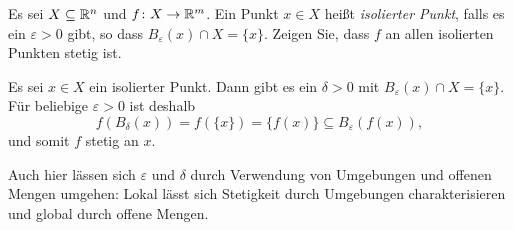 \documentclass[a4paper,10pt]{article}
\begin{document}
\begin{question}
 Es sei $X \subseteq \mathbb{R}^n$ und $f \colon X \to \mathbb{R}^m$. Ein Punkt $x \in X$ heißt \emph{isolierter Punkt}, falls es ein $\varepsilon > 0$ gibt, so dass $B_\varepsilon(x) \cap X = \{x\}$. Zeigen Sie, dass $f$ an allen isolierten Punkten stetig ist.
\end{question}
\begin{solution}
 Es sei $x \in X$ ein isolierter Punkt. Dann gibt es ein $\delta > 0$ mit $B_\varepsilon(x) \cap X = \{x\}$. Für beliebige $\varepsilon > 0$ ist deshalb
 \[
  f(B_\delta(x)) = f(\{x\}) = \{f(x)\} \subseteq B_\varepsilon(f(x)),
 \]
 und somit $f$ stetig an $x$.
\end{solution}



Auch hier lässen sich $\varepsilon$ und $\delta$ durch Verwendung von Umgebungen und offenen Mengen umgehen: Lokal lässt sich Stetigkeit durch Umgebungen charakterisieren und global durch offene Mengen.
\end{document}
